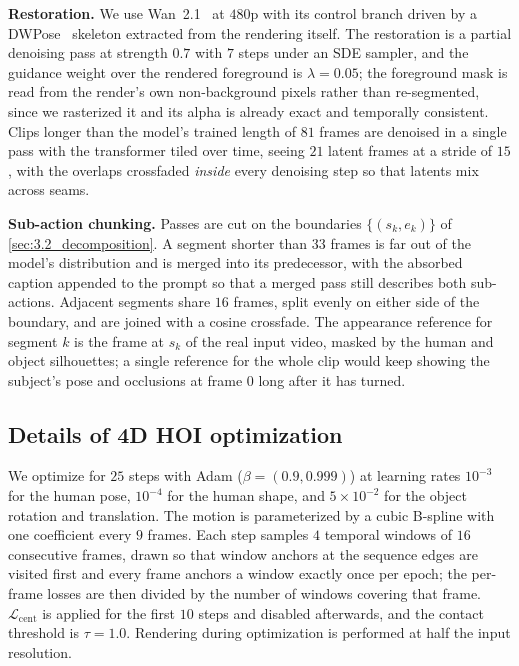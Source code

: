 \noindent\textbf{Restoration.}
We use Wan~2.1~\cite{wan2025wan} at $480$p with its control branch driven by a
DWPose~\cite{yang2023effective} skeleton extracted from the rendering itself.
The restoration is a partial denoising pass at strength $0.7$ with $7$ steps
under an SDE sampler, and the guidance weight over the rendered foreground is
$\lambda=0.05$; the foreground mask is read from the render's own non-background
pixels rather than re-segmented, since we rasterized it and its alpha is already
exact and temporally consistent.
Clips longer than the model's trained length of $81$ frames are denoised in a
single pass with the transformer tiled over time, seeing $21$ latent frames at a
stride of $15$, with the overlaps crossfaded \emph{inside} every denoising step
so that latents mix across seams.

\noindent\textbf{Sub-action chunking.}
Passes are cut on the boundaries $\{(s_k,e_k)\}$ of \cref{sec:3.2_decomposition}.
A segment shorter than $33$ frames is far out of the model's distribution and is
merged into its predecessor, with the absorbed caption appended to the prompt so
that a merged pass still describes both sub-actions.
Adjacent segments share $16$ frames, split evenly on either side of the
boundary, and are joined with a cosine crossfade.
The appearance reference for segment $k$ is the frame at $s_k$ of the real input
video, masked by the human and object silhouettes; a single reference for the
whole clip would keep showing the subject's pose and occlusions at frame $0$
long after it has turned.

\subsection{Details of 4D HOI optimization}
\label{sec:supp_optimization}

We optimize for $25$ steps with Adam ($\beta=(0.9,0.999)$) at learning rates
$10^{-3}$ for the human pose, $10^{-4}$ for the human shape, and $5\times10^{-2}$
for the object rotation and translation.
The motion is parameterized by a cubic B-spline with one coefficient every $9$
frames.
Each step samples $4$ temporal windows of $16$ consecutive frames, drawn so that
window anchors at the sequence edges are visited first and every frame anchors a
window exactly once per epoch; the per-frame losses are then divided by the
number of windows covering that frame.
$\mathcal{L}_{\text{cent}}$ is applied for the first $10$ steps and disabled
afterwards, and the contact threshold is $\tau=1.0$.
Rendering during optimization is performed at half the input resolution.